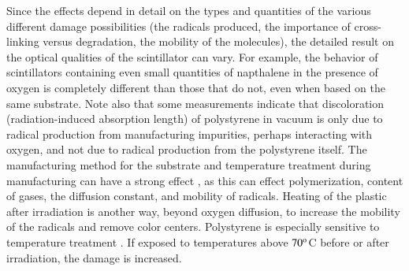 Since the effects depend in detail on the types and quantities
of the various different damage possibilities (the radicals produced,
the importance of cross-linking versus degradation, the mobility of
the molecules), the detailed result on the optical qualities
of the scintillator can vary.
For example, the behavior of scintillators
containing even small quantities of napthalene in the presence of oxygen is completely
different than those that do not, even when based
on the same substrate\cite{Wick1991472}.
Note also that some measurements \cite{todd} indicate
that discoloration (radiation-induced absorption length) 
of polystyrene in vacuum is only due
to radical production from manufacturing impurities, perhaps
interacting with oxygen, and not due to radical production
from the polystyrene itself.
The manufacturing method for the substrate
and temperature treatment during manufacturing
can have a strong effect \cite{bicken} \cite{johnson},
as this can effect polymerization, content of gases, the
diffusion constant, and mobility of radicals.  Heating
of the plastic after irradiation is another way, beyond
oxygen diffusion, to increase
the mobility of the radicals and remove color centers.
Polystyrene is especially sensitive to temperature treatment
\cite{bicken}.  If exposed to temperatures above ${\rm 70^o}$C
before or after irradiation, the damage is increased.

